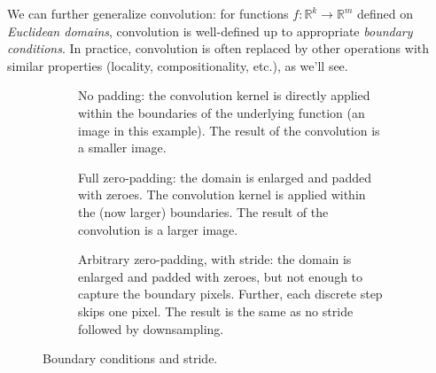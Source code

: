 We can further generalize convolution: for functions $f:\mathbb{R}^k \to \mathbb{R}^m$ defined on \textit{Euclidean domains}, convolution is well-defined up to appropriate \textit{boundary conditions}. In practice, convolution is often replaced by other operations with similar properties (locality, compositionality, etc.), as we'll see.

\begin{figure}[H]
    \centering
    \begin{subfigure}[t]{0.3\textwidth}
        \centering
        \caption{No padding: the convolution kernel is directly applied within the boundaries of the underlying function (an image in this example). The result of the convolution is a smaller image.}
    \end{subfigure}
    \hfill
    \begin{subfigure}[t]{0.3\textwidth}
        \centering
        \caption{Full zero-padding: the domain is enlarged and padded with zeroes. The convolution kernel is applied within the (now larger) boundaries. The result of the convolution is a larger image.}
    \end{subfigure}
    \hfill
    \begin{subfigure}[t]{0.3\textwidth}
        \centering
        \caption{Arbitrary zero-padding, with stride: the domain is enlarged and padded with zeroes, but not enough to capture the boundary pixels. Further, each discrete step skips one pixel. The result is the same as no stride followed by downsampling.}
    \end{subfigure}
    \caption{Boundary conditions and stride.}
\end{figure}